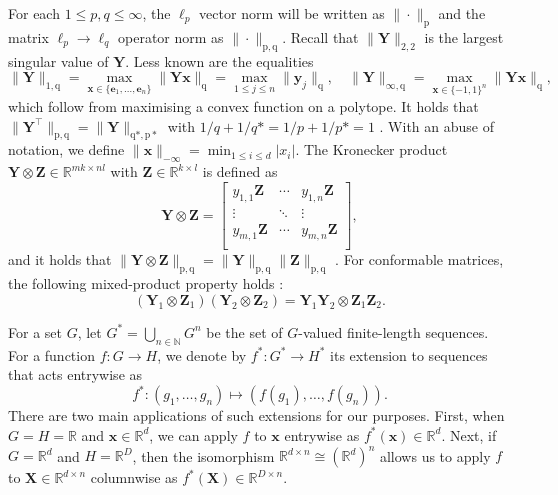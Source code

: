 \documentclass[namedate,webpdf,imanum]{ima-authoring-template}
\newcommand{\Real}{\mathbb{R}}
\newcommand{\N}{\mathbb{N}}
\newcommand{\Matrix}[1]{\mathbf{#1}}
\newcommand{\trans}{\intercal}
\newcommand{\Norm}[3][]{#1\| #2 #1\|_{\mathrm{#3}}}
\newcommand{\krp}{\mathbin{\otimes}}
\numberwithin{equation}{section}
\begin{document}
For each $1 \leq p,q \leq \infty$, the $\ell_p$ vector norm will be written as $\Norm{\cdot}{p}$ and the matrix $\ell_p \to \ell_q$ operator norm as $\Norm{\cdot}{p,q}$.
Recall that $\Norm{\Matrix{Y}}{2,2}$ is the largest singular value of $\Matrix{Y}$. 
Less known are the equalities
\begin{equation*}
    \Norm{\Matrix{Y}}{1,q} = \max_{\Matrix{x} \in \{ \Matrix{e}_1, \ldots, \Matrix{e}_n\} } \Norm{\Matrix{Y} \Matrix{x}}{q} = \max_{1 \leq j \leq n} \Norm{\Matrix{y}_j}{q}, \quad \Norm{\Matrix{Y}}{\infty,q} = \max_{\Matrix{x} \in \{ -1,1 \}^n} \Norm{\Matrix{Y} \Matrix{x}}{q},
\end{equation*}
which follow from maximising a convex function on a polytope.
It holds that $\Norm{\Matrix{Y}^\trans}{p,q} = \Norm{\Matrix{Y}}{q*, p*}$ with $1/q + 1/q* = 1/p + 1/p* = 1$ \cite[Theorem~5.6.35]{horn2012matrix}.
With an abuse of notation, we define $\Norm{\Matrix{x}}{-\infty} = \min_{1 \leq i \leq d} |x_i|$.
The Kronecker product $\Matrix{Y} \krp \Matrix{Z} \in \Real^{mk \times nl}$ with $\Matrix{Z} \in \Real^{k \times l}$ is defined as
\begin{equation*}
    \Matrix{Y} \krp \Matrix{Z} = \begin{bmatrix}
        y_{1,1} \Matrix{Z} & \cdots & y_{1,n} \Matrix{Z} \\
        \vdots & \ddots & \vdots \\
        y_{m,1} \Matrix{Z} & \cdots & y_{m,n} \Matrix{Z} \\
    \end{bmatrix},
\end{equation*}
and it holds that $\Norm{\Matrix{Y} \krp \Matrix{Z}}{p,q} = \Norm{\Matrix{Y}}{p,q} \Norm{\Matrix{Z}}{p,q}$ \cite[Theorem~8]{lancaster1972norms}.
For conformable matrices, the following mixed-product property holds \cite[Lemma~4.2.10]{horn1994topics}:
\begin{equation*}
    (\Matrix{Y}_1 \krp \Matrix{Z}_1)(\Matrix{Y}_2 \krp \Matrix{Z}_2) = \Matrix{Y}_1\Matrix{Y}_2 \krp \Matrix{Z}_1\Matrix{Z}_2.
\end{equation*}

For a set $G$, let $G^\ast = \bigcup_{n \in \N} G^{n}$ be the set of $G$-valued finite-length sequences.
For a function $f: G \to H$, we denote by $f^\ast : G^\ast \to H^\ast$ its extension to sequences that acts entrywise as
\begin{equation*}
    f^\ast : (g_1, \ldots, g_n) \mapsto (f(g_1), \ldots, f(g_n)).
\end{equation*}
There are two main applications of such extensions for our purposes.
First, when $G = H = \Real$ and $\Matrix{x} \in \Real^{d}$, we can apply $f$ to $\Matrix{x}$ entrywise as $f^\ast(\Matrix{x}) \in \Real^{d}$.
Next, if $G = \Real^d$ and $H = \Real^D$, then the isomorphism $\Real^{d \times n} \cong (\Real^d)^n$ allows us to apply $f$ to $\Matrix{X} \in \Real^{d \times n}$ columnwise as $f^\ast(\Matrix{X}) \in \Real^{D \times n}$.
\end{document}
